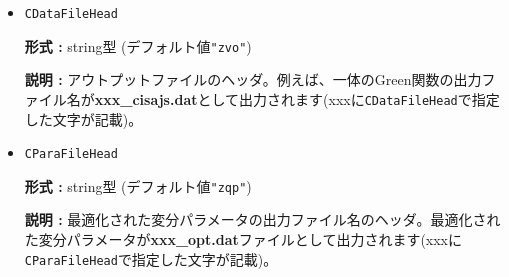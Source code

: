 \begin{itemize}
  \item  \verb|CDataFileHead|

 {\bf 形式 :} string型 (デフォルト値\verb|"zvo"|)

{\bf 説明 :} アウトプットファイルのヘッダ。例えば、一体のGreen関数の出力ファイル名が{\bf xxx\_cisajs.dat}として出力されます(xxxに\verb|CDataFileHead|で指定した文字が記載)。

 \item  \verb|CParaFileHead|

 {\bf 形式 :} string型 (デフォルト値\verb|"zqp"|)

{\bf 説明 :} 最適化された変分パラメータの出力ファイル名のヘッダ。最適化された変分パラメータが{\bf xxx\_opt.dat}ファイルとして出力されます(xxxに\verb|CParaFileHead|で指定した文字が記載)。
 
 \end{itemize}

 
